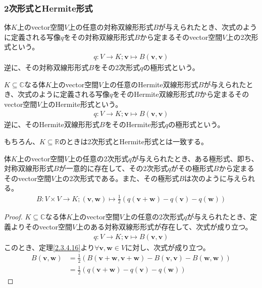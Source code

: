 \documentclass[dvipdfmx]{jsarticle}
\begin{document}
\subsubsection{2次形式とHermite形式}
\begin{dfn}
体$K$上のvector空間$V$上の任意の対称双線形形式$B$が与えられたとき、次式のように定義される写像$q$をその対称双線形形式$B$から定まるそのvector空間$V$上の2次形式という。
\begin{align*}
q:V \rightarrow K;\mathbf{v} \mapsto B\left( \mathbf{v},\mathbf{v} \right)
\end{align*}
逆に、その対称双線形形式$B$をその2次形式$q$の極形式という。
\end{dfn}
\begin{dfn}
$K \subseteq \mathbb{C}$なる体$K$上のvector空間$V$上の任意のHermite双線形形式$B$が与えられたとき、次式のように定義される写像$q$をそのHermite双線形形式$B$から定まるそのvector空間$V$上のHermite形式という。
\begin{align*}
q:V \rightarrow K;\mathbf{v} \mapsto B\left( \mathbf{v},\mathbf{v} \right)
\end{align*}
逆に、そのHermite双線形形式$B$をそのHermite形式$q$の極形式という。
\end{dfn}\par
もちろん、$K \subseteq \mathbb{R}$のときは2次形式とHermite形式とは一致する。
\begin{thm}\label{2.3.5.1}
体$K$上のvector空間$V$上の任意の2次形式$q$が与えられたとき、ある極形式、即ち、対称双線形形式$B$が一意的に存在して、その2次形式$q$がその極形式$B$から定まるそのvector空間$V$上の2次形式である。また、その極形式$B$は次のように与えられる。
\begin{align*}
B:V \times V \rightarrow K;\left( \mathbf{v},\mathbf{w} \right) \mapsto \frac{1}{2}\left( q\left( \mathbf{v} + \mathbf{w} \right) - q\left( \mathbf{v} \right) - q\left( \mathbf{w} \right) \right)
\end{align*}
\end{thm}
\begin{proof}
$K \subseteq \mathbb{C}$なる体$K$上のvector空間$V$上の任意の2次形式$q$が与えられたとき、定義よりそのvector空間$V$上のある対称双線形形式が存在して、次式が成り立つ。
\begin{align*}
q:V \rightarrow K;\mathbf{v} \mapsto B\left( \mathbf{v},\mathbf{v} \right)
\end{align*}
このとき、定理\ref{2.3.4.16}より$\forall\mathbf{v},\mathbf{w} \in V$に対し、次式が成り立つ。
\begin{align*}
B\left( \mathbf{v},\mathbf{w} \right) &= \frac{1}{2}\left( B\left( \mathbf{v} + \mathbf{w},\mathbf{v} + \mathbf{w} \right) - B\left( \mathbf{v},\mathbf{v} \right) - B\left( \mathbf{w},\mathbf{w} \right) \right)\\
&= \frac{1}{2}\left( q\left( \mathbf{v} + \mathbf{w} \right) - q\left( \mathbf{v} \right) - q\left( \mathbf{w} \right) \right)
\end{align*}
\end{proof}
\end{document}
